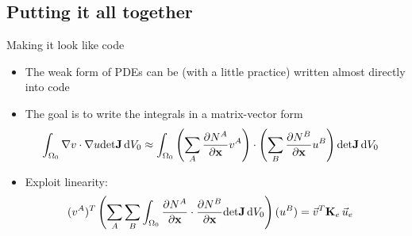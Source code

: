 \subsection{Putting it all together}
\begin{frame}{Making it look like code}
  \begin{itemize}
  \item
    The weak form of PDEs can be (with a little practice) written
    almost directly into code
  \item
    The goal is to write the integrals in a matrix-vector form
    \begin{align*}
      \int_{\Omega_0} \nabla v \cdot \nabla u \mathrm{det}\mathbf{J}\,\mathrm{d}V_0 &\approx
      \int_{\Omega_0} \left(\sum_A \frac{\partial N^A}{\partial \mathbf{x}} v^A\right) 
      \cdot \left(\sum_B \frac{\partial N^B}{\partial \mathbf{x}} u^B\right) 
      \mathrm{det}\mathbf{J}\,\mathrm{d}V_0
    \end{align*}
  \item
    Exploit linearity:
    \begin{align*}
      (v^A)^T\left(\sum_A \sum_B \int_{\Omega_0} \frac{\partial N^A}{\partial \mathbf{x}} 
      \cdot \frac{\partial N^B}{\partial \mathbf{x}}
      \mathrm{det}\mathbf{J}\,\mathrm{d}V_0 \right) (u^B)
      &= \vec{v}^T \mathbf{K}_e \,\vec{u}_e
    \end{align*}
  \end{itemize}
\end{frame}
